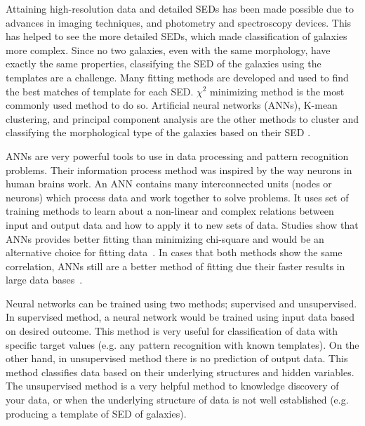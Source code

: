 \documentclass[useAMS,usenatbib]{mn2e}
\begin{document}
Attaining high-resolution data and detailed SEDs has been made possible due to advances in imaging techniques, and photometry and spectroscopy devices.
This has helped to see the more detailed SEDs, which made classification of galaxies more complex.
Since no two galaxies, even with the same morphology, have exactly the same properties, classifying the SED of the galaxies using the templates are a challenge.
Many fitting methods are developed and used to find the best matches of template for each SED.
$\chi^2$ minimizing method is the most commonly used method to do so. 
Artificial neural networks (ANNs), K-mean clustering, and principal component analysis are the other methods to cluster and classifying the morphological type of the galaxies based on their SED \citep[e.g.][]{Allen13,Ordov14,Shi15}.

ANNs are very powerful tools to use in data processing and pattern recognition problems.
Their information process method was inspired by the way neurons in human brains work.
An ANN contains many interconnected units (nodes or neurons) which process data and work together to solve problems.
It uses set of training methods to learn about a non-linear and complex relations between input and output data and how to apply it to new sets of data.
Studies show that ANNs provides better fitting than minimizing chi-square and would be an alternative choice for fitting data~\citep[e.g.][]{Marquez91,Moayed09}.
In cases that both methods show the same correlation, ANNs still are a better method of fitting due their faster results in large data bases~\citep[][]{Gulati97}.

Neural networks can be trained using two methods; supervised and unsupervised.
In supervised method, a neural network would be trained using input data based on desired outcome.
This method is very useful for classification of data with specific target values (e.g. any pattern recognition with known templates).
On the other hand, in unsupervised method there is no prediction of output data.
This method classifies data based on their underlying structures and hidden variables.
The unsupervised method is a very helpful method to knowledge discovery of your data, or when the underlying structure of data is not well established (e.g. producing a template of SED of galaxies).
\end{document}
